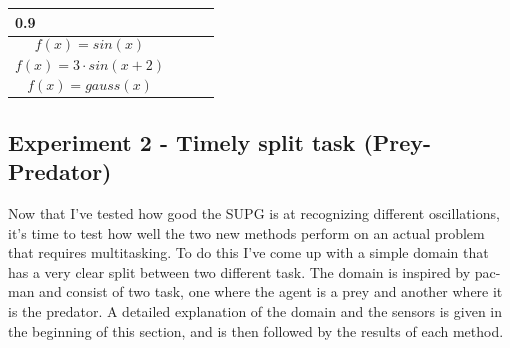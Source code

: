 \documentclass[11pt, a4paper]{article}
\begin{document}
\begin{center}
\begin{tabular}{ | p{4cm} | l | l | l |}
0.9
\\
    \hline
   \begin{equation} f(x) = sin(x) \nonumber \end{equation}  &
    &  &  \\
   \hline
   \begin{equation} f(x) = 3 \cdot sin(x+2) \nonumber \end{equation}  & & &  \\
   \hline
   \begin{equation} f(x) = gauss(x) \nonumber \end{equation}  & & &  \\
      \hline
    \end{tabular}
\end{center}
\subsection{Experiment 2 - Timely split task (Prey-Predator)}
Now that I've tested how good the SUPG is at recognizing different oscillations, it's time to test how well the two new methods perform on an actual problem that requires multitasking. To do this I've come up with a simple domain that has a very clear split between two different task. The domain is inspired by pac-man and consist of two task, one where the agent is a prey and another where it is the predator. A detailed explanation of the domain and the sensors is given in the beginning of this section, and is then followed by the results of each method. 
\end{document}
